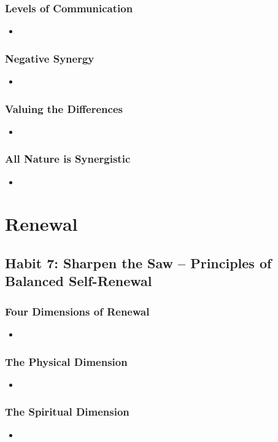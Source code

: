 \documentclass[11pt]{article}
\begin{document}
\subsubsection{Levels of Communication}
\begin{itemize}
\item 
\end{itemize}
\subsubsection{Negative Synergy}
\begin{itemize}
\item 
\end{itemize}
\subsubsection{Valuing the Differences}
\begin{itemize}
\item 
\end{itemize}
\subsubsection{All Nature is Synergistic}
\begin{itemize}
\item 
\end{itemize}
\section{Renewal}
\subsection{Habit 7: Sharpen the Saw -- Principles of Balanced Self-Renewal}
\subsubsection{Four Dimensions of Renewal}
\begin{itemize}
\item 
\end{itemize}
\subsubsection{The Physical Dimension}
\begin{itemize}
\item 
\end{itemize}
\subsubsection{The Spiritual Dimension}
\begin{itemize}
\item 
\end{itemize}
\end{document}
